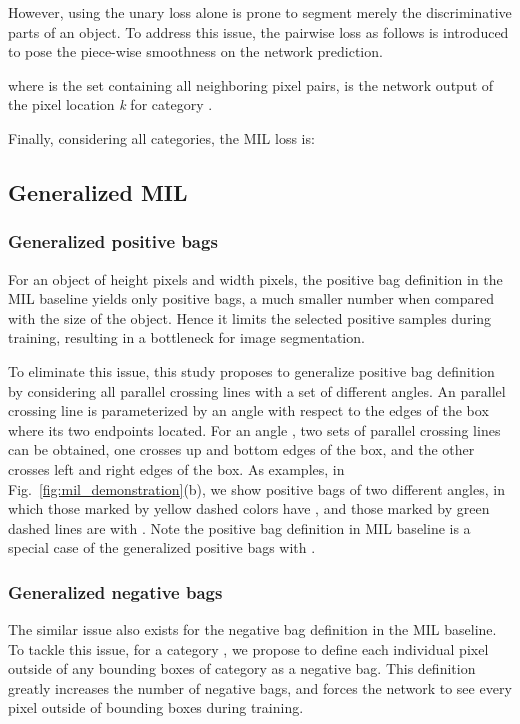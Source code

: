 \documentclass[runningheads]{llncs}
\begin{document}
However, using the unary loss alone is prone to segment merely the discriminative parts of an object. To address this issue, the pairwise loss as follows is introduced to pose the piece-wise smoothness on the network prediction.

where  is the set containing all neighboring pixel pairs,  is the network output of the pixel location \textit{k} for category .

Finally, considering all  categories, the MIL loss  is:



\subsection{Generalized MIL}

\subsubsection{Generalized positive bags}
For an object of height  pixels and width  pixels, the positive bag definition in the MIL baseline yields only  positive bags, a much smaller number when compared with the size of the object. Hence it limits the selected positive samples during training, resulting in a bottleneck for image segmentation.

To eliminate this issue, this study proposes to generalize positive bag definition by considering all parallel crossing lines with a set of different angles. An parallel crossing line is parameterized by an angle  with respect to the edges of the box where its two endpoints located. For an angle , two sets of parallel crossing lines can be obtained, one crosses up and bottom edges of the box, and the other crosses left and right edges of the box. As examples, in Fig.~\ref{fig:mil_demonstration}(b), we show positive bags of two different angles, in which those marked by yellow dashed colors have , and those marked by green dashed lines are with . Note the positive bag definition in MIL baseline is a special case of the generalized positive bags with .  

\subsubsection{Generalized negative bags}
The similar issue also exists for the negative bag definition in the MIL baseline. To tackle this issue, for a category , we propose to define each individual pixel outside of any bounding boxes of category  as a negative bag. This definition greatly increases the number of negative bags, and forces the network to see every pixel outside of bounding boxes during training. 
\end{document}
